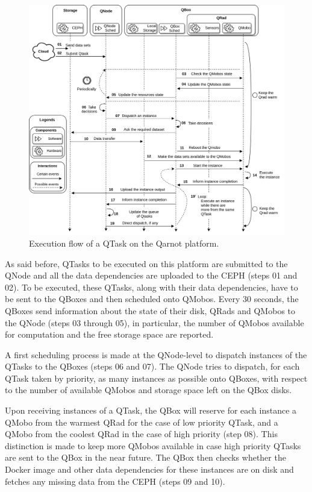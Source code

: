 \begin{figure} %
    \centering
    \includegraphics[width=1\textwidth]{images/qarnot-diagram.png}
    \caption{Execution flow of a QTask on the Qarnot platform.}
    \label{fig:qarnot-diagram}
\end{figure}

As said before, QTasks to be executed on this platform are submitted to the QNode and all the data dependencies are uploaded to the CEPH (steps 01 and 02).
To be executed, these QTasks, along with their data dependencies, have to be sent to the QBoxes and then scheduled onto QMobos.
Every 30 seconds, the QBoxes send information about the state of their disk, QRads and QMobos to the QNode (steps 03 through 05), in particular, the number of QMobos available for computation and the free storage space are reported.

A first scheduling process is made at the QNode-level to dispatch instances of the QTasks to the QBoxes (steps 06 and 07). The QNode tries to dispatch, for each QTask taken by priority, as many instances as possible onto QBoxes, with respect to the number of available QMobos and storage space left on the QBox disks.

Upon receiving instances of a QTask, the QBox will reserve for each instance a QMobo from the warmest QRad for the case of low priority QTask, and a QMobo from the coolest QRad in the case of high priority (step 08).
This distinction is made to keep more QMobos available in case high priority QTasks are sent to the QBox in the near future. The QBox then checks whether the Docker image and other data dependencies for these instances are on disk and fetches any missing data from the CEPH (steps 09 and 10).

